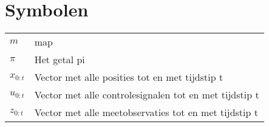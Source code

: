 \documentclass{book}
\begin{document}
\section*{Symbolen}
\begin{flushleft}
\renewcommand{\arraystretch}{1.1}
\begin{tabularx}{\textwidth}{@{}p{12mm}X@{}}
	$m$   & map \\
	$\pi$ & Het getal pi \\
	$x_{0:t}$ & Vector met alle posities tot en met tijdstip t \\
	$u_{0:t}$ & Vector met alle controlesignalen tot en met tijdstip t \\
	$z_{0:t}$ & Vector met alle meetobservaties tot en met tijdstip t \\
\end{tabularx}
\end{flushleft}


\mainmatter


\end{document}
